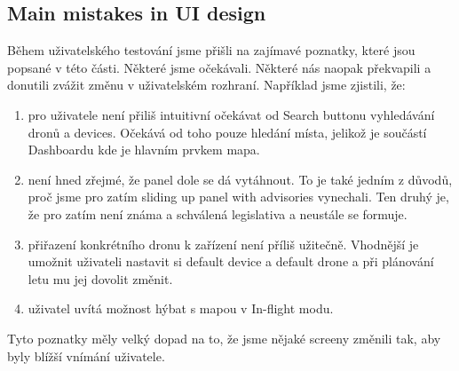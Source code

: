 \subsection{Main mistakes in UI design}\label{subsec:main-mistakes-in-ui-design}
Během uživatelského testování jsme přišli na zajímavé poznatky, které jsou popsané v této části.
Některé jsme očekávali.
Některé nás naopak překvapili a donutili zvážit změnu v uživatelském rozhraní.
Například jsme zjistili, že:
\begin{enumerate}
    \item pro uživatele není přiliš intuitivní očekávat od Search buttonu vyhledávání dronů a devices.
    Očekává od toho pouze hledání místa, jelikož je součástí Dashboardu kde je hlavním prvkem mapa.
    \item není hned zřejmé, že panel dole se dá vytáhnout.
    To je také jedním z důvodů, proč jsme pro zatím sliding up panel with advisories vynechali.
    Ten druhý je, že pro zatím není známa a schválená legislativa a neustále se formuje.
    \item přiřazení konkrétního dronu k zařízení není příliš užitečně.
    Vhodnější je umožnit uživateli nastavit si default device a default drone a při plánování letu mu jej dovolit změnit.
    \item uživatel uvítá možnost hýbat s mapou v In-flight modu.
\end{enumerate}
Tyto poznatky měly velký dopad na to, že jsme nějaké screeny změnili tak, aby byly blížší vnímání uživatele.